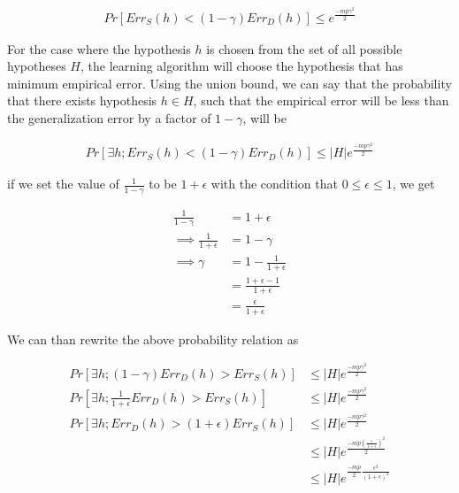 \begin{enumerate}
\begin{equation*}
\begin{aligned}
Pr \left[Err_S(h) < (1 - \gamma)Err_D(h)\right] \leq e^{\frac{-mp\gamma^2}{2}}
\end{aligned}
\end{equation*}

For the case where the hypothesis $h$ is chosen from the set of all possible hypotheses $H$, the learning algorithm will choose the hypothesis that has minimum empirical error. Using the union bound, we can say that the probability that there exists hypothesis $h \in H$, such that the empirical error will be less than the generalization error by a factor of $1-\gamma$, will be

\begin{equation*}
\begin{aligned}
Pr \left[\exists h; Err_S(h) < (1-\gamma)Err_D(h)\right] \leq \left | H \right | e^{\frac{-mp\gamma^2}{2}}
\end{aligned}
\end{equation*}

if we set the value of $\frac{1}{1-\gamma}$ to be $1+\epsilon$ with the condition that $0 \leq \epsilon \leq 1$, we get

\begin{equation*}
\begin{aligned}
\frac{1}{1-\gamma} &= 1+ \epsilon\\
\implies \frac{1}{1+\epsilon} &= 1- \gamma\\
\implies \gamma &= 1-\frac{1}{1+\epsilon} \\
&= \frac{1+\epsilon -1}{1+\epsilon}\\
&= \frac{\epsilon}{1+\epsilon}
\end{aligned}
\end{equation*}


We can than rewrite the above probability relation as 

\begin{equation*}
\begin{aligned}
Pr \left[\exists h; (1-\gamma)Err_D(h) > Err_S(h) \right] &\leq \left | H \right | e^{\frac{-mp\gamma^2}{2}}\\
Pr \left[\exists h; \frac{1}{1+\epsilon} Err_D(h) > Err_S(h) \right] &\leq \left | H \right | e^{\frac{-mp\gamma^2}{2}}\\
Pr \left[\exists h; Err_D(h) > (1+\epsilon)Err_S(h) \right] &\leq \left | H \right | e^{\frac{-mp\gamma^2}{2}}\\
&\leq \left | H \right | e^{\frac{-mp(\frac{\epsilon}{1+\epsilon})^2}{2}}\\
&\leq \left | H \right | e^ {\frac{-mp}{2} \frac{\epsilon^2}{(1+\epsilon)^2}}
\end{aligned}
\end{equation*}


\end{enumerate}
